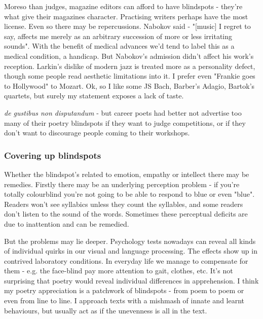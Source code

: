 \documentclass[11pt]{article}
\begin{document}
 Moreso than judges, magazine editors can afford to have blindspots - they're  what give their
  magazines character. Practising writers perhaps have the most license. Even so there may be repercussions.
Nabokov said - "[music] I regret to say, affects me merely as an arbitrary succession of more or less irritating sounds". With the benefit of medical advances we'd tend to label this as a medical condition, a handicap. But Nabokov's admission didn't affect his work's reception.
Larkin's dislike of modern jazz is treated more as a personality defect, though
  some people read aesthetic limitations into it. 
I prefer even "Frankie goes to Hollywood" to Mozart. Ok, so I like some JS Bach, Barber's Adagio, Bartok's quartets, but surely my statement exposes a lack of taste.




\textit{de gustibus non disputandum} - but
career poets had better not advertise too many of their poetry blindspots if they want to judge competitions, or if they don't want to discourage people coming to their workshops.


\subsubsection*{Covering up blindspots}

Whether the blindspot's related to emotion, empathy or intellect there may
  be remedies. Firstly there may be an underlying perception problem - if
  you're totally colourblind you're not going to be able to respond to blue or
  even "blue". Readers won't see syllabics unless they count the syllables,
  and some readers don't listen to the  sound of the words. Sometimes these
  perceptual deficits are due to inattention and can be remedied.



But the problems may lie deeper. Psychology tests nowadays can reveal all kinds of individual quirks in our
visual and language processing. The effects show up in contrived laboratory
conditions. In everyday life we manage to compensate for them - e.g. the face-blind
pay more attention to gait, clothes, etc. It's not surprising that poetry would
reveal individual differences in apprehension. I think my poetry appreciation
is a patchwork of blindspots - from poem to poem or even from line to line. I approach texts with a mishmash of innate and learnt behaviours, but usually act as if the unevenness is all in the text.
\end{document}
